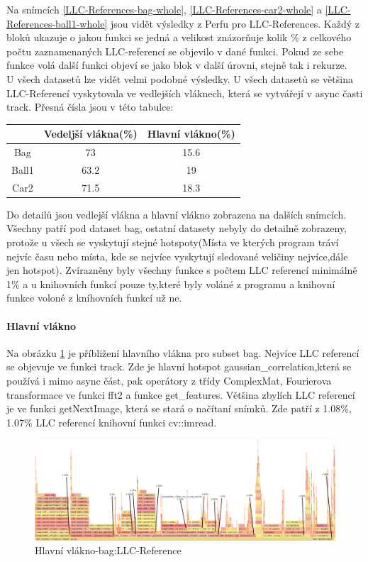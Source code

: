 \documentclass{article}
\begin{document}
Na snímcích \ref{LLC-References-bag-whole}, \ref{LLC-References-car2-whole} a \ref{LLC-References-ball1-whole} jsou vidět výsledky z Perfu pro LLC-References. Každý z bloků ukazuje o jakou funkci se jedná a velikost znázorňuje kolik \% z celkového počtu zaznamenaných LLC-referencí se objevilo v dané funkci. Pokud ze sebe funkce volá další funkci objeví se jako blok v další úrovni, stejně tak i rekurze.\\
U všech datasetů lze vidět velmi podobné výsledky. U všech datasetů se většina LLC-Referencí vyskytovala ve vedlejších vláknech, která se vytvářejí v async časti track. Přesná čísla jsou v této tabulce:\\
\begin{center}
\begin{tabular}{|c|c|c|}
	\hline 
	& Vedeljší vlákna(\%) & Hlavní vlákno(\%) \\ 
	\hline 
	Bag & 73 & 15.6 \\ 
	\hline 
	Ball1 & 63.2 & 19 \\ 
	\hline 
	Car2 & 71.5 & 18.3 \\ 
	\hline
\end{tabular}
\end{center}
Do detailů jsou vedlejší vlákna a hlavní vlákno zobrazena na dalších snímcích. Všechny patří pod dataset bag, ostatní datasety nebyly do detailně zobrazeny, protože u všech se vyskytují stejné hotspoty(Místa ve kterých program tráví nejvíc času nebo místa, kde se nejvíce vyskytují sledované veličiny nejvíce,dále jen hotspot). Zvírazněny byly všechny funkce s počtem LLC referencí minimálně 1\% a u knihovních funkcí pouze ty,které byly voláné z programu a knihovní funkce voloné z kníhovních funkcí už ne.
\newpage
\paragraph{Hlavní vlákno}
Na obrázku \ref{LLC-References-main} je příbližení hlavního vlákna pro subset bag. Nejvíce LLC referencí se objevuje ve funkci track. Zde je hlavní hotspot gaussian\_correlation,která se používá i mimo async část, pak operátory z třídy ComplexMat, Fourierova transformace ve funkci fft2 a funkce get\_features. Většina zbylích LLC referencí je ve funkci getNextImage, která se stará o načítaní snímků. Zde patří z 1.08\%, 1.07\% LLC referencí knihovní funkci cv::imread.
\begin{figure}[h]
	\centering
	\includegraphics[width=\linewidth]{Perf/Bag/LLC-References-bag-closeup-main-gimp.png}
	\caption{Hlavní vlákno-bag:LLC-Reference}
	\label{LLC-References-main}
\end{figure}
\end{document}
